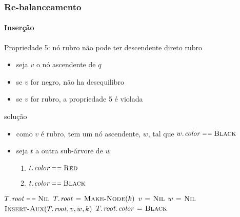 \documentclass{beamer}
\begin{document}
\begin{frame}

\frametitle{Re-balanceamento}
\framesubtitle{Inserção}

Propriedade 5: nó rubro não pode ter descendente direto rubro

\begin{itemize}

\item seja $v$ o nó ascendente de $q$

\item se $v$ for negro, não ha desequilibro

\item se $v$ for rubro, a propriedade 5 é violada

\end{itemize}

\pause

\alert{solução}

\begin{itemize}

\item como $v$ é rubro, tem um nó ascendente, $w$, tal que $\attrib{w}{color} \isequal \const{Black}$

\item seja $t$ a outra sub-árvore de $w$

\begin{enumerate}

\item $\attrib{t}{color} \isequal \const{Red}$

\item $\attrib{t}{color} \isequal \const{Black}$

\end{enumerate}

\end{itemize}

\end{frame}

\begin{frame}

\begin{codebox}
\li \If $\attrib{T}{root} \isequal \const{Nil}$
\li \Then $\attrib{T}{root} \gets \proc{Make-Node}(k)$
\li \Else 
      $v \mathrel{\hspace{1pt}=\hspace{1pt}} \textnormal{\scshape Nil}$
\li   $w \mathrel{\hspace{1pt}=\hspace{1pt}} \textnormal{\scshape Nil}$
\li   $\proc{Insert-Aux}(\attrib{T}{root}, v, w, k)$
    \End
\li $\attrib{\attrib{T}{root}}{color} \gets \const{Black}$
\end{codebox}

\end{frame}
\end{document}
